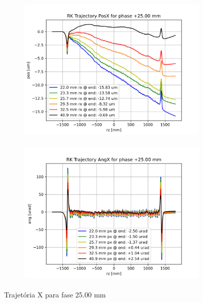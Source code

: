 \documentclass[a4paper,12pt]{article}
\begin{document}
\begin{figure}[H]
\begin{subfigure}{0.5\textwidth}
\includegraphics[width=0.9\linewidth, height=7cm]{figs/phase25 RK Posx.png} 
\label{fig:subim125tx}
\end{subfigure}
\begin{subfigure}{0.5\textwidth}
\includegraphics[width=0.9\linewidth, height=7cm]{figs/phase25 RK Angx.png}
\label{fig:subim225tx}
\end{subfigure}
\caption{Trajetória X para fase 25.00 mm}
\label{fig:trajx_25}
\end{figure}
\end{document}
